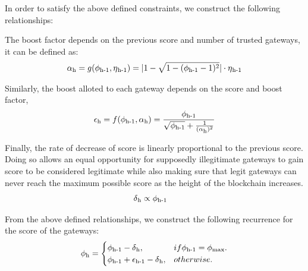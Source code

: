 \documentclass[letterpaper,11pt]{article}
\begin{document}
In order to satisfy the above defined constraints, we construct the following relationships:

The boost factor depends on the previous score and number of trusted gateways, it can be defined as:
\begin{equation} \label{alpha}
\begin{split}
\alpha\textsubscript{h} &= g(\phi\textsubscript{h-1}, \eta\textsubscript{h-1}) = \lvert1 - \sqrt{1 - (\phi\textsubscript{h-1} - 1)^2}\rvert \cdot \eta\textsubscript{h-1}\\
\end{split}
\end{equation}

Similarly, the boost alloted to each gateway depends on the score and boost factor,
\begin{equation} \label{epsilon}
\begin{split}
\epsilon\textsubscript{h} &= f(\phi\textsubscript{h-1}, \alpha\textsubscript{h}) = \frac{\phi\textsubscript{h-1}}{\sqrt{\phi\textsubscript{h-1}} + \frac{1}{(\alpha\textsubscript{h})^2}}\\
\end{split}
\end{equation}

Finally, the rate of decrease of score is linearly proportional to the previous score. Doing so allows an equal opportunity for supposedly illegitimate gateways to gain score to be considered legitimate while also making sure that legit gateways can never reach the maximum possible score as the height of the blockchain increases.
\begin{equation} \label{delta}
\begin{split}
\delta\textsubscript{h} &\propto \phi\textsubscript{h-1}
\end{split}
\end{equation}

From the above defined relationships, we construct the following recurrence for the score of the gateways:
\begin{equation} \label{score}
	\phi\textsubscript{h} = \begin{cases}
		\phi\textsubscript{h-1} - \delta\textsubscript{h}, &if \phi\textsubscript{h-1} = \phi\textsubscript{max}.\\
		\phi\textsubscript{h-1} + \epsilon\textsubscript{h-1} - \delta\textsubscript{h}, &{otherwise}.
	\end{cases}
\end{equation}
\end{document}
